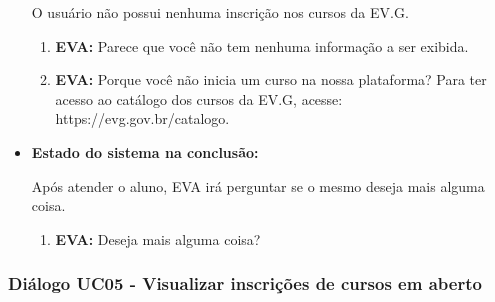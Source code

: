 \begin{itemize}
        O usuário não possui nenhuma inscrição nos cursos da EV.G.
        
        \begin{enumerate}
            \item \textbf{EVA:} Parece que você não tem nenhuma informação a ser exibida.
            \item \textbf{EVA:} Porque você não inicia um curso na nossa plataforma? Para ter acesso ao catálogo dos cursos da EV.G, acesse: https://evg.gov.br/catalogo.
        \end{enumerate}
    
    \item \textbf{Estado do sistema na conclusão:}
    
        Após atender o aluno, EVA irá perguntar se o mesmo deseja mais alguma coisa.
        
        \begin{enumerate}
            \item \textbf{EVA:} Deseja mais alguma coisa?
        \end{enumerate}
\end{itemize}


\subsubsection{Diálogo UC05 - Visualizar inscrições de cursos em aberto}

